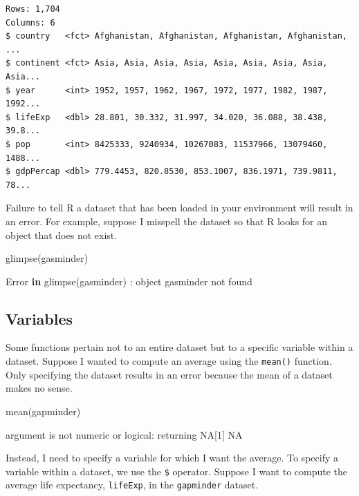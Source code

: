 \documentclass[
]{book}
\makeatletter
\newenvironment{Shaded}{\begin{snugshade}}{\end{snugshade}}
\newcommand{\ConstantTok}[1]{\textcolor[rgb]{0,0,0}{#1}}
\newcommand{\ControlFlowTok}[1]{\textcolor[rgb]{0.27,0.27,0.27}{\textbf{#1}}}
\newcommand{\DecValTok}[1]{\textcolor[rgb]{0.06,0.06,0.06}{#1}}
\newcommand{\FunctionTok}[1]{\textcolor[rgb]{0,0,0}{#1}}
\newcommand{\NormalTok}[1]{#1}
\newcommand{\SpecialCharTok}[1]{\textcolor[rgb]{0,0,0}{#1}}
\newcommand{\StringTok}[1]{\textcolor[rgb]{0.5,0.5,0.5}{#1}}
\newenvironment{kframe}{%
\medskip{}
\setlength{\fboxsep}{.8em}
 \def\at@end@of@kframe{}%
 \ifinner\ifhmode%
  \def\at@end@of@kframe{\end{minipage}}%
  \begin{minipage}{\columnwidth}%
 \fi\fi%
 \def\FrameCommand##1{\hskip\@totalleftmargin \hskip-\fboxsep
 \colorbox{shadecolor}{##1}\hskip-\fboxsep
     \hskip-\linewidth \hskip-\@totalleftmargin \hskip\columnwidth}%
 \MakeFramed {\advance\hsize-\width
   \@totalleftmargin\z@ \linewidth\hsize
   \@setminipage}}%
 {\par\unskip\endMakeFramed%
 \at@end@of@kframe}
\renewenvironment{Shaded}{\begin{kframe}}{\end{kframe}}
\makeatother
\begin{document}
\begin{verbatim}
Rows: 1,704
Columns: 6
$ country   <fct> Afghanistan, Afghanistan, Afghanistan, Afghanistan, ...
$ continent <fct> Asia, Asia, Asia, Asia, Asia, Asia, Asia, Asia, Asia...
$ year      <int> 1952, 1957, 1962, 1967, 1972, 1977, 1982, 1987, 1992...
$ lifeExp   <dbl> 28.801, 30.332, 31.997, 34.020, 36.088, 38.438, 39.8...
$ pop       <int> 8425333, 9240934, 10267083, 11537966, 13079460, 1488...
$ gdpPercap <dbl> 779.4453, 820.8530, 853.1007, 836.1971, 739.9811, 78...
\end{verbatim}

Failure to tell R a dataset that has been loaded in your environment will result in an error. For example, suppose I misspell the dataset so that R looks for an object that does not exist.

\begin{Shaded}
\begin{Highlighting}[]
\FunctionTok{glimpse}\NormalTok{(gasminder)}

\NormalTok{Error }\ControlFlowTok{in} \FunctionTok{glimpse}\NormalTok{(gasminder) }\SpecialCharTok{:}\NormalTok{ object }\StringTok{\textquotesingle{}gasminder\textquotesingle{}}\NormalTok{ not found}
\end{Highlighting}
\end{Shaded}

\hypertarget{variables}{%
\subsection{Variables}\label{variables}}

Some functions pertain not to an entire dataset but to a specific variable within a dataset. Suppose I wanted to compute an average using the \texttt{mean()} function. Only specifying the dataset results in an error because the mean of a dataset makes no sense.

\begin{Shaded}
\begin{Highlighting}[]
\FunctionTok{mean}\NormalTok{(gapminder)}

\NormalTok{argument is not numeric or logical}\SpecialCharTok{:}\NormalTok{ returning }\ConstantTok{NA}\NormalTok{[}\DecValTok{1}\NormalTok{] }\ConstantTok{NA}
\end{Highlighting}
\end{Shaded}

Instead, I need to specify a variable for which I want the average. To specify a variable within a dataset, we use the \texttt{\$} operator. Suppose I want to compute the average life expectancy, \texttt{lifeExp}, in the \texttt{gapminder} dataset.
\end{document}

